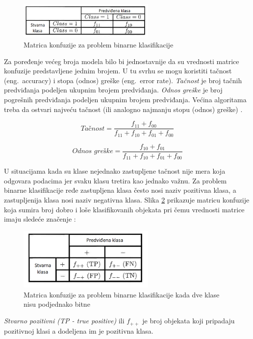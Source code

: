 \documentclass[12pt,oneside]{memoir}
\begin{document}
\begin{figure}[!ht]
  \centering
  \includegraphics[width=0.60\textwidth]{matrica_konfuzije}
  \caption{Matrica konfuzije za problem binarne klasifikacije}
  \label{fig:matrkonf}
\end{figure}

 Za poređenje većeg broja modela bilo bi jednostavnije da su vrednosti matrice konfuzije predstavljene jednim brojem. U tu svrhu se mogu koristiti tačnost (eng.~accuracy)  i stopa (odnos) greške (eng.~error rate). \textit{Tačnost} je broj tačnih predviđanja podeljen ukupnim brojem predviđanja. \textit{Odnos greške} je broj pogrešnih predviđanja podeljen ukupnim brojem predviđanja. Većina algoritama treba da ostvari najveću tačnost (ili analogno najmanju stopu (odnos) greške) \cite{mitic}.

$$ \textit{Tačnost} = \frac{f_{11}+f_{00}}{f_{11}+f_{10}+f_{01}+f_{00}} $$

$$ \textit{Odnos greške} = \frac{f_{10}+f_{01}}{f_{11}+f_{10}+f_{01}+f_{00}} $$

U situacijama kada su klase nejednako zastupljene tačnost nije mera koja odgovara podacima jer svaku klasu tretira kao jednako važnu. Za problem binarne klasifikacije ređe zastupljena klasa često nosi naziv pozitivna klasa, a zastupljenija klasa nosi naziv negativna klasa. Slika \ref{fig:matrkonf2} prikazuje matricu konfuzije koja sumira broj dobro i loše klasifikovanih objekata pri čemu vrednosti matrice imaju sledeće značenje \cite{mitic}:

\begin{figure}[!ht]
  \centering
  \includegraphics[width=0.60\textwidth]{matrica_konfuzije2}
  \caption{Matrica konfuzije za problem binarne klasifikacije kada dve klase nisu podjednako bitne}
  \label{fig:matrkonf2}
\end{figure}

\textit{Stvarno pozitivni (TP - true positive)} ili $f_{++}$ je broj objekata koji pripadaju pozitivnoj klasi a dodeljena im je pozitivna klasa.
\end{document}
